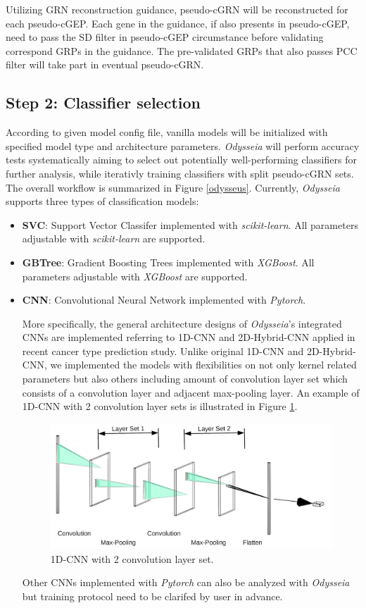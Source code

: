 \documentclass[fleqn,10pt]{wlscirep}
\begin{document}
Utilizing GRN reconstruction guidance, pseudo-cGRN will be reconstructed for each pseudo-cGEP.
Each gene in the guidance, if also presents in pseudo-cGEP, need to pass the SD filter in pseudo-cGEP circumstance before validating correspond GRPs in the guidance.
The pre-validated GRPs that also passes PCC filter will take part in eventual pseudo-cGRN.

\subsection*{Step 2: Classifier selection}
\label{step2}
According to given model config file, vanilla models will be initialized with specified model type and architecture parameters.
\emph{Odysseia} will perform accuracy tests systematically aiming to select out potentially well-performing classifiers for further analysis, while iterativly training classifiers with split pseudo-cGRN sets.
The overall workflow is summarized in Figure \ref{odysseus}.
Currently, \emph{Odysseia} supports three types of classification models:
\begin{itemize}
\setlength\itemsep{0em}
\item \textbf{SVC}: Support Vector Classifer implemented with \emph{scikit-learn}.\cite{scikit-learn}
All parameters adjustable with \emph{scikit-learn}\cite{scikit-learn} are supported.
\item \textbf{GBTree}: Gradient Boosting Trees implemented with \emph{XGBoost}.\cite{chen2016xgboost}
All parameters adjustable with \emph{XGBoost}\cite{chen2016xgboost} are supported.
\item \textbf{CNN}: Convolutional Neural Network implemented with \emph{Pytorch}\cite{NEURIPS2019_9015}.

More specifically, the general architecture designs of \emph{Odysseia}'s integrated CNNs are implemented referring to 1D-CNN and 2D-Hybrid-CNN applied in recent cancer type prediction study\cite{mostavi_chiu_huang_chen_2020}.
Unlike original 1D-CNN and 2D-Hybrid-CNN, we implemented the models with flexibilities on not only kernel related parameters but also others including amount of convolution layer set which consists of a convolution layer and adjacent max-pooling layer.
An example of 1D-CNN with 2 convolution layer sets is illustrated in Figure \ref{1dCNN}.
\begin{figure}[ht]
\centering
\includegraphics[width=0.8\linewidth]{image/nn.png}
\caption{1D-CNN with 2 convolution layer set.}
\label{1dCNN}
\end{figure}

Other CNNs implemented with \emph{Pytorch}\cite{NEURIPS2019_9015} can also be analyzed with \emph{Odysseia} but training protocol need to be clarifed by user in advance.
\end{itemize}
\end{document}
